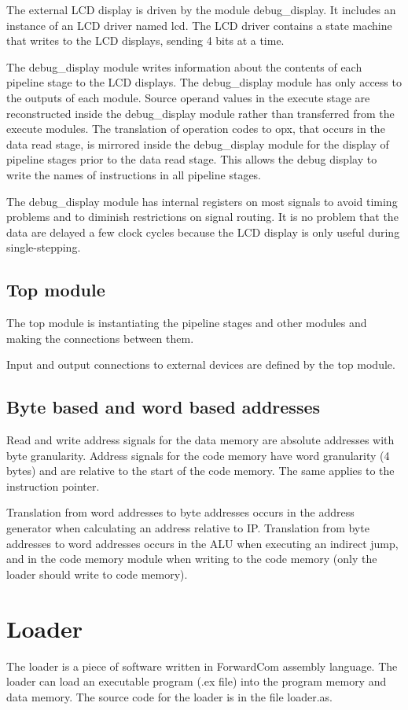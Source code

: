 \documentclass[11pt,a4paper,oneside,openright]{report}
\newcommand{\vv}{ \vspace{2mm} }   %
\begin{document}
The external LCD display is driven by the module debug\_display. 
It includes an instance of an LCD driver named lcd. 
The LCD driver contains a state machine that writes to the LCD displays, sending 4 bits at a time.
\vv

The debug\_display module writes information about the contents of each pipeline stage to the LCD displays. The debug\_display module has only access to the outputs of each module. Source operand values in the execute stage are reconstructed inside the debug\_display module rather than transferred from the execute modules. The translation of operation codes to opx, that occurs in the data read stage, is mirrored inside the debug\_display module for the display of pipeline stages prior to the data read stage. This allows the debug display to write the names of instructions in all pipeline stages.
\vv

The debug\_display module has internal registers on most signals to avoid timing problems and to diminish restrictions on signal routing. It is no problem that the data are delayed a few clock cycles because the LCD display is only useful during single-stepping.
\vv


\subsection{Top module}
The top module is instantiating the pipeline stages and other modules and making the connections between them.
\vv

Input and output connections to external devices are defined by the top module.
\vv


\subsection{Byte based and word based addresses}
Read and write address signals for the data memory are absolute addresses with byte granularity. Address signals for the code memory have word granularity (4 bytes) and are relative to the start of the code memory. The same applies to the instruction pointer.
\vv

Translation from word addresses to byte addresses occurs in the address generator when calculating an address relative to IP. Translation from byte addresses to word addresses occurs in the ALU when executing an indirect jump, and in the code memory module when writing to the code memory (only the loader should write to code memory).
\vv


\section{Loader} \label{Chap:Loader}
The loader is a piece of software written in ForwardCom assembly language. The loader can load an executable program (.ex file) into the program memory and data memory. The source code for the loader is in the file loader.as. 
\vv
\end{document}
